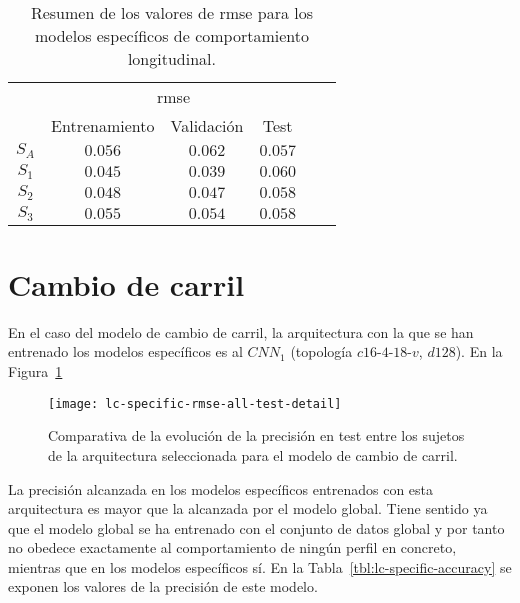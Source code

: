 \begin{table}
	\centering
	\caption[Resumen de los valores de \gls{rmse} para los modelos específicos de comportamiento longitudinal]{Resumen de los valores de \gls{rmse} para los modelos específicos de comportamiento longitudinal.}
	\label{tbl:lm-specific-rmse}
	\begin{tabular}{cccccc}
		\toprule
		\multirow{2}{*}{} & \multicolumn{3}{c}{\ac{rmse}}      \\ 
		& Entrenamiento & Validación & Test \\
		\midrule
		\rowcolor{black!20} $S_A$ & $0.056$ & $0.062$ & $0.057$  \\
		$S_1$ & $0.045$ & $0.039$ & $0.060$  \\
		\rowcolor{black!20} $S_2$ & $0.048$ & $0.047$ & $0.058$  \\
		$S_3$ & $0.055$ & $0.054$ & $0.058$  \\
		\bottomrule
	\end{tabular}
\end{table}

\section{Cambio de carril}

En el caso del modelo de cambio de carril, la arquitectura con la que se han entrenado los modelos específicos es al $CNN_1$ (topología $c16$-$4$-$18$-$v$, $d128$). En la Figura~\ref{fig:lc-specific-rmse-all-test-detail} 

\begin{figure}
	\centering
	\texttt{[image: lc-specific-rmse-all-test-detail]}
	\caption[\gls{rmse} en test entre los sujetos de la arquitectura seleccionada para el modelo de cambio de carril]{Comparativa de la evolución de la precisión en test entre los sujetos de la arquitectura seleccionada para el modelo de cambio de carril.}
	\label{fig:lc-specific-rmse-all-test-detail}
\end{figure}

La precisión alcanzada en los modelos específicos entrenados con esta arquitectura es mayor que la alcanzada por el modelo global. Tiene sentido ya que el modelo global se ha entrenado con el conjunto de datos global y por tanto no obedece exactamente al comportamiento de ningún perfil en concreto, mientras que en los modelos específicos sí. En la Tabla~\ref{tbl:lc-specific-accuracy} se exponen los valores de la precisión de este modelo.


